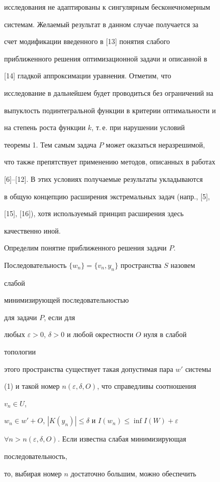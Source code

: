 исследования не адаптированы к сингулярным бесконечномерным 


системам. Желаемый результат в данном случае получается за 


счет модификации введенного в [13] понятия слабого 


приближенного решения оптимизационной задачи и описанной в 


[14] гладкой аппроксимации уравнения. Отметим, что 


исследование в дальнейшем будет проводиться без ограничений на 


выпуклость подинтегральной функции в критерии оптимальности и 


на степень роста функции $k$, т.\,е. при нарушении условий 


теоремы 1. Тем самым задача $P$ может оказаться неразрешимой, 


что также препятствует применению методов, описанных в работах 


[6]--[12]. В этих условиях получаемые результаты укладываются 


в общую концепцию расширения экстремальных задач (напр., [5], 


[15], [16]), хотя используемый принцип расширения здесь 


качественно иной. 


 


Определим понятие приближенного решения задачи $P$. 


Последовательность $\{w_n\}=\{v_n,y_n\}$ пространства $S$ назовем {\it 


слабой 


минимизирующей последовательностью} для задачи $P$, если для 


любых $\varepsilon>0$, $\delta>0$ и любой окрестности $O$ нуля в слабой 


топологии 


этого пространства существует такая допустимая пара $w'$ системы 


(1) и такой номер $n(\varepsilon,\delta,O)$, что справедливы соотношения 


$v_n\in U$,


$w_n\in w'+O$, $|K(y_n)|\le\delta$ и $I(w_n)\le\inf I(W)+\varepsilon$ 


$\forall n>n(\varepsilon,\delta,O)$. Если известна слабая минимизирующая 


последовательность, 


то, выбирая номер $n$ достаточно большим, можно обеспечить 


